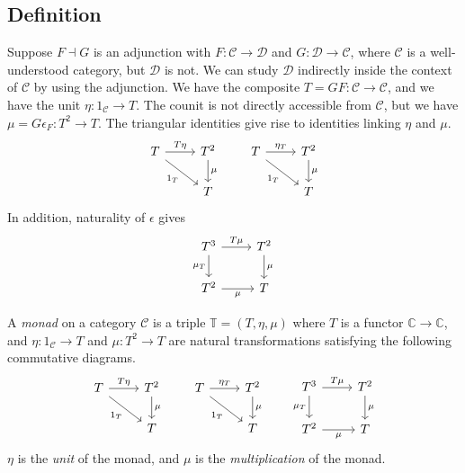 \subsection{Definition}
Suppose \( F \dashv G \) is an adjunction with \( F : \mathcal C \to \mathcal D \) and \( G : \mathcal D \to \mathcal C \), where \( \mathcal C \) is a well-understood category, but \( \mathcal D \) is not.
We can study \( \mathcal D \) indirectly inside the context of \( \mathcal C \) by using the adjunction.
We have the composite \( T = GF : \mathcal C \to \mathcal C \), and we have the unit \( \eta : 1_{\mathcal C} \to T \).
The counit is not directly accessible from \( \mathcal C \), but we have \( \mu = G\epsilon_F : T^2 \to T \).
The triangular identities give rise to identities linking \( \eta \) and \( \mu \).
\[\begin{tikzcd}
	T & {T^2} \\
	& T
	\arrow["T\eta", from=1-1, to=1-2]
	\arrow["\mu", from=1-2, to=2-2]
	\arrow["{1_T}"', from=1-1, to=2-2]
\end{tikzcd}\quad\quad\begin{tikzcd}
	T & {T^2} \\
	& T
	\arrow["{\eta_T}", from=1-1, to=1-2]
	\arrow["\mu", from=1-2, to=2-2]
	\arrow["{1_T}"', from=1-1, to=2-2]
\end{tikzcd}\]
In addition, naturality of \( \epsilon \) gives
\[\begin{tikzcd}
	{T^3} & {T^2} \\
	{T^2} & T
	\arrow["T\mu", from=1-1, to=1-2]
	\arrow["\mu", from=1-2, to=2-2]
	\arrow["{\mu_T}"', from=1-1, to=2-1]
	\arrow["\mu"', from=2-1, to=2-2]
\end{tikzcd}\]
\begin{definition}
    A \emph{monad} on a category \( \mathcal C \) is a triple \( \mathbb T = (T, \eta, \mu) \) where \( T \) is a functor \( \mathbb C \to \mathbb C \), and \( \eta : 1_{\mathcal C} \to T \) and \( \mu : T^2 \to T \) are natural transformations satisfying the following commutative diagrams.
    \[\begin{tikzcd}
        T & {T^2} \\
        & T
        \arrow["T\eta", from=1-1, to=1-2]
        \arrow["\mu", from=1-2, to=2-2]
        \arrow["{1_T}"', from=1-1, to=2-2]
    \end{tikzcd}\quad\quad\begin{tikzcd}
        T & {T^2} \\
        & T
        \arrow["{\eta_T}", from=1-1, to=1-2]
        \arrow["\mu", from=1-2, to=2-2]
        \arrow["{1_T}"', from=1-1, to=2-2]
    \end{tikzcd}\quad\quad\begin{tikzcd}
        {T^3} & {T^2} \\
        {T^2} & T
        \arrow["T\mu", from=1-1, to=1-2]
        \arrow["\mu", from=1-2, to=2-2]
        \arrow["{\mu_T}"', from=1-1, to=2-1]
        \arrow["\mu"', from=2-1, to=2-2]
    \end{tikzcd}\]
    \( \eta \) is the \emph{unit} of the monad, and \( \mu \) is the \emph{multiplication} of the monad.
\end{definition}
